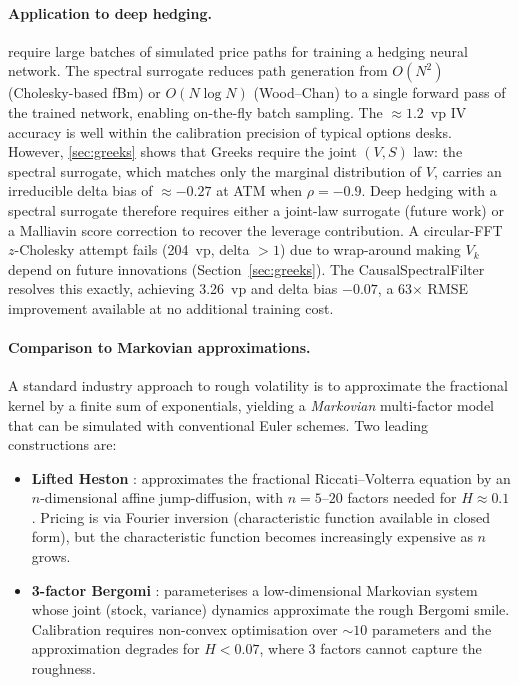 \documentclass[11pt,a4paper]{article}
\begin{document}
\paragraph{Application to deep hedging.}
\citet{buhler2019deep} require large batches of simulated price paths for
training a hedging neural network. The spectral surrogate reduces
path generation from $O(N^2)$ (Cholesky-based fBm) or $O(N \log N)$
(Wood--Chan) to a single forward pass of the trained network, enabling
on-the-fly batch sampling. The $\approx 1.2$~vp IV accuracy is well
within the calibration precision of typical options desks.
However, \cref{sec:greeks} shows that Greeks require the joint $(V, S)$
law: the spectral surrogate, which matches only the marginal distribution
of $V$, carries an irreducible delta bias of $\approx -0.27$ at ATM
when $\rho = -0.9$. Deep hedging with a spectral surrogate therefore
requires either a joint-law surrogate (future work) or a Malliavin
score correction to recover the leverage contribution. A circular-FFT $z$-Cholesky attempt fails (204~vp, delta $>1$) due to
wrap-around making $V_k$ depend on future innovations
(Section~\ref{sec:greeks}). The CausalSpectralFilter resolves this
exactly, achieving 3.26~vp and delta bias $-0.07$, a 63$\times$ RMSE
improvement available at no additional training cost.

\paragraph{Comparison to Markovian approximations.}
A standard industry approach to rough volatility is to approximate the
fractional kernel by a finite sum of exponentials, yielding a
\emph{Markovian} multi-factor model that can be simulated with
conventional Euler schemes. Two leading constructions are:

\begin{itemize}
 \item \textbf{Lifted Heston} \citep{abijaber2019affine,el2019perfect}:
  approximates the fractional Riccati--Volterra equation by an
  $n$-dimensional affine jump-diffusion, with $n=5$--$20$ factors
  needed for $H \approx 0.1$. Pricing is via Fourier inversion
  (characteristic function available in closed form), but the
  characteristic function becomes increasingly expensive as $n$ grows.
 \item \textbf{3-factor Bergomi} \citep{bayer2020markovian}:
  parameterises a low-dimensional Markovian system whose joint
  (stock, variance) dynamics approximate the rough Bergomi
  smile. Calibration requires non-convex optimisation over
  $\sim 10$ parameters and the approximation degrades for
  $H < 0.07$, where 3 factors cannot capture the roughness.
\end{itemize}
\end{document}
